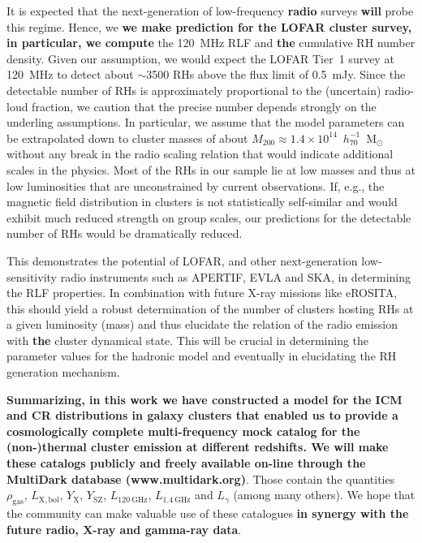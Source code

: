 \documentclass[traditabstract]{aa}
\def\C#1{{\bf #1}}
\newcommand{\rmn}{\mathrm}
\begin{document}
It is expected that the next-generation of low-frequency \C{radio} surveys \C{will} probe this
regime. Hence, we \C{we make prediction for the LOFAR cluster survey, in particular, we compute} 
the 120~MHz RLF and \C{the} cumulative RH number density. Given our assumption, we would
expect the LOFAR Tier~1 survey at 120~MHz to detect about $\sim$3500 RHs above
the flux limit of 0.5~mJy. Since the detectable number of RHs is approximately
proportional to the (uncertain) radio-loud fraction, we caution that the precise
number depends strongly on the underling assumptions. In particular, we
assume that the model parameters can be extrapolated down to cluster masses of
about $M_{200}\approx1.4\times10^{14}$~$h_{70}^{-1}$~M$_{\odot}$ without any
break in the radio scaling relation that would indicate additional scales in the
physics.  Most of the RHs in our sample lie at low masses and thus at low
luminosities that are unconstrained by current observations. If, e.g., the
magnetic field distribution in clusters is not statistically self-similar and
would exhibit much reduced strength on group scales, our predictions for the
detectable number of RHs would be dramatically reduced.

This demonstrates the potential of LOFAR, and other next-generation
low-sensitivity radio instruments such as APERTIF, EVLA and SKA, in determining
the RLF properties. In combination with future X-ray missions like eROSITA, this
should yield a robust determination of the number of clusters hosting RHs at a
given luminosity (mass) and thus elucidate the relation of the radio emission
with \C{the} cluster dynamical state. This will be crucial in determining the parameter
values for the hadronic model and eventually in elucidating the RH generation
mechanism.

\C{Summarizing, in this work we have constructed a model for the ICM and CR
distributions in galaxy clusters that enabled us to provide a cosmologically complete 
multi-frequency mock catalog for the (non-)thermal cluster emission at different redshifts. We
will make these catalogs publicly and freely available on-line through the MultiDark database
(www.multidark.org)}. Those contain the quantities $\rho_{\rmn{gas}}$, $L_{\rmn{X, bol}}$, $Y_{\rmn{X}}$,
$Y_{\rmn{SZ}}$, $L_{120~\rmn{GHz}}$, $L_{1.4~\rmn{GHz}}$ and $L_{\gamma}$ (among
many others). We hope that the community can make valuable use of these
catalogues \C{in synergy with the future radio, X-ray and gamma-ray data}.
\end{document}
